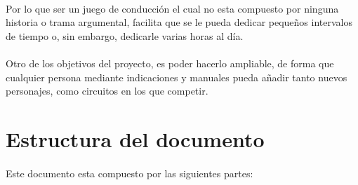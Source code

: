 \paragraph{}
Por lo que ser un juego de conducción el cual no esta compuesto por ninguna historia o trama argumental, facilita que se le pueda
dedicar pequeños intervalos de tiempo o, sin embargo, dedicarle varias horas al día.

\paragraph{}
Otro de los objetivos del proyecto, es poder hacerlo ampliable, de forma que cualquier persona mediante indicaciones y manuales
pueda añadir tanto nuevos personajes, como circuitos en los que competir.

\section{Estructura del documento}

\paragraph{}
Este documento esta compuesto por las siguientes partes:

